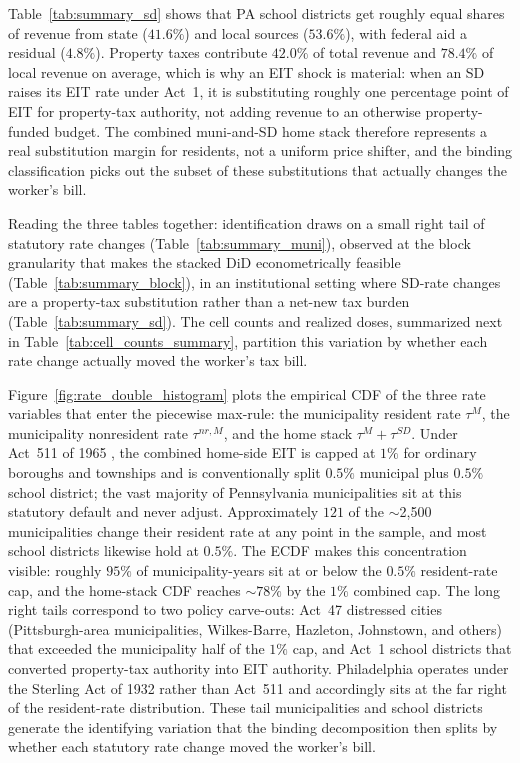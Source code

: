 \documentclass[12pt]{article}
\begin{document}


Table~\ref{tab:summary_sd} shows that PA school districts get
roughly equal shares of revenue from state ($41.6\%$) and local
sources ($53.6\%$), with federal aid a residual ($4.8\%$). Property
taxes contribute $42.0\%$ of total revenue and $78.4\%$ of local
revenue on average, which is why an EIT shock is material: when an
SD raises its EIT rate under Act~1, it is substituting roughly one
percentage point of EIT for property-tax authority, not adding
revenue to an otherwise property-funded budget. The combined
muni-and-SD home stack therefore represents a real substitution
margin for residents, not a uniform price shifter, and the
binding classification picks out the subset of these
substitutions that actually changes the worker's bill.

Reading the three tables together: identification draws on a small
right tail of statutory rate changes (Table~\ref{tab:summary_muni}),
observed at the block granularity that makes the stacked DiD
econometrically feasible (Table~\ref{tab:summary_block}), in an
institutional setting where SD-rate changes are a property-tax
substitution rather than a net-new tax burden
(Table~\ref{tab:summary_sd}). The cell counts and
realized doses, summarized next in
Table~\ref{tab:cell_counts_summary}, partition this variation by
whether each rate change actually moved the worker's tax bill.



Figure~\ref{fig:rate_double_histogram} plots the empirical CDF of
the three rate variables that enter the piecewise max-rule: the
municipality resident rate $\tau^M$, the municipality nonresident rate
$\tau^{nr,M}$, and the home stack $\tau^M + \tau^{SD}$. Under
Act~511 of 1965 \citep{paAct511_1965}, the combined home-side EIT
is capped at $1\%$ for ordinary boroughs and townships and is
conventionally split $0.5\%$ municipal plus $0.5\%$ school district;
the vast majority of Pennsylvania municipalities sit at this
statutory default and never adjust. Approximately $121$ of the
$\sim$2{,}500 municipalities change their resident rate at any
point in the sample, and most school districts likewise hold at
$0.5\%$. The ECDF makes this concentration visible: roughly $95\%$
of municipality-years sit at or below the $0.5\%$ resident-rate
cap, and the home-stack CDF reaches $\sim 78\%$ by the $1\%$
combined cap. The long right tails correspond to two policy
carve-outs: Act~47 distressed cities \citep{paAct47_1987}
(Pittsburgh-area municipalities, Wilkes-Barre, Hazleton, Johnstown,
and others) that exceeded the municipality half of the $1\%$ cap, and Act~1
school districts \citep{paAct1_2006} that converted property-tax
authority into EIT authority. Philadelphia operates under the
Sterling Act of 1932 \citep{paSterlingAct_1932} rather than Act~511
and accordingly sits at the far right of the resident-rate
distribution. These tail municipalities and school districts
generate the identifying variation that the binding
decomposition then splits by whether each statutory rate change
moved the worker's bill.
\end{document}

